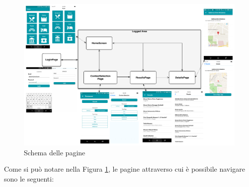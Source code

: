 \begin{figure}[H]
	\centering
	\includegraphics[height=\textwidth, angle=90]{4-progettazione-alto-livello/Immagini/screen_schema.pdf}
	\caption{Schema delle pagine}\label{fig:screen-schema}
\end{figure}
\newpage
Come si può notare nella Figura \ref{fig:screen-schema}, le pagine attraverso cui è possibile navigare sono le seguenti:

